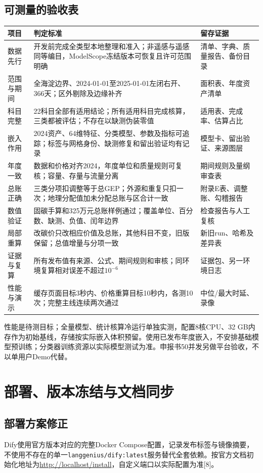 \documentclass[12pt,a4paper,fontset=fandol]{ctexart}
\newcommand{\file}[1]{\nolinkurl{#1}}
\begin{document}
\subsection{可测量的验收表}
{\small
\begin{longtable}{P{2.3cm}P{7cm}P{3.7cm}}
\toprule 项目 & 判定标准 & 留存证据 \\\midrule\endhead
数据先行 & 开发前完成全类型本地整理和准入；非遥感与遥感同等编目，ModelScope冻结版本可恢复且许可范围明确 & 清单、字典、质量报告、备份目录 \\
范围与期间 & 全海淀边界、2024-01-01至2025-01-01左闭右开、366天；区外剔除及边缘补齐 & 面积表、年度资产清单 \\
科目完整 & 22科目全部有适用结论；所有适用科目完成核算，三类都被评估；不存在以缺测伪装零值 & 适用表、完成率、估算占比 \\
嵌入作用 & 2024资产、64维特征、分类模型、参数及指标可追踪；标签与网格身份、缺测修复和留出验证均有记录 & 模型卡、留出验证、来源图层 \\
年度一致 & 数据和价格对齐2024，年度单位和质量规则可复核；容量、存量与流量分离 & 期间规则及量纲审查表 \\
总账正确 & 三类分项扣调整等于总GEP；外源和重复只扣一次；地理分配值加未分配总账与区合计一致 & 附录E表、调整账、勾稽报告 \\
数值验证 & 固碳手算和325万元总账样例通过；覆盖单位、百分数、缺测、负值、闰年边界 & 检查报告与人工复核 \\
局部重算 & 改碳价只改相应价值及总账，其他科目不变，旧版保留；总值增量与分项一致 & 新旧run、哈希及差异表 \\
证据与复算 & 所有发布值有来源、公式、期间规则和审核；同环境复算相对误差不超过$10^{-6}$ & 证据包、另一环境日志 \\
性能与演示 & 缓存页面目标3秒内、价格重算目标10秒内，各测10次；完整主线连续两次通过 & 中位/最大时延、录像 \\
\bottomrule
\end{longtable}}
性能是待测目标；全量模型、统计核算冷运行单独实测，配置8核CPU、32 GB内存作为初始基线，存储按实际嵌入体积预留。使用已发布年度嵌入，不安排基础模型预训练；分类器训练资源以实际模型测试为准。申报书50并发另做平台验收，不以单用户Demo代替。

\section{部署、版本冻结与文档同步}
\subsection{部署方案修正}
Dify使用官方版本对应的完整Docker Compose配置，记录发布标签与镜像摘要，不使用不存在的单一\file{langgenius/dify:latest}服务替代全套依赖。按官方文档初始化地址为\url{http://localhost/install}，自定义端口以实际配置为准[8]。
\end{document}
